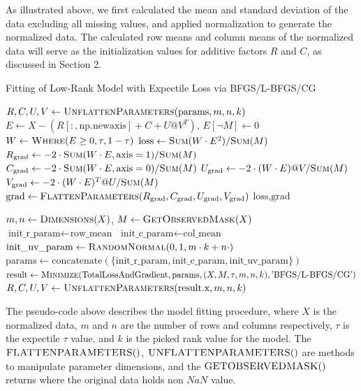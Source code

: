 \documentclass{article}
\begin{document}
As illustrated above, we first calculated the mean and standard deviation of the data excluding all missing values, and applied normalization to generate the normalized data. The calculated row means and column means of the normalized data will serve as the initialization values for additive factors $R$ and $C$, as discussed in Section 2. 


\begin{algorithm}[H]
\caption{Fitting of Low-Rank Model with Expectile Loss via BFGS/L-BFGS/CG}
\begin{algorithmic}[1]
    \State $R, C, U, V \gets \Call{UnflattenParameters}{\text{params}, m, n, k}$
    \State $E \gets X - (R[:, \text{np.newaxis}] + C + U @ V^T)$, $E[\neg M] \gets 0$
    \State $W \gets \Call{Where}{E \geq 0, \tau, 1 - \tau}$
    \State $\text{loss} \gets \Call{Sum}{W \cdot E^2} / \Call{Sum}{M}$
    \State $R_{\text{grad}} \gets -2 \cdot \Call{Sum}{W \cdot E, \text{axis}=1} / \Call{Sum}{M}$
    \State $C_{\text{grad}} \gets -2 \cdot \Call{Sum}{W \cdot E, \text{axis}=0} / \Call{Sum}{M}$
    \State $U_{\text{grad}} \gets -2 \cdot (W \cdot E) @ V / \Call{Sum}{M}$
    \State $V_{\text{grad}} \gets -2 \cdot (W \cdot E)^T @ U / \Call{Sum}{M}$
    \State $\text{grad} \gets \Call{FlattenParameters}{R_{\text{grad}}, C_{\text{grad}}, U_{\text{grad}}, V_{\text{grad}}}$
    \State \Return $\text{loss}, \text{grad}$
\EndFunction


    \State $m, n \gets \Call{Dimensions}{X}$, $M \gets \Call{GetObservedMask}{X}$
    \State $\text{init\_r\_param} \gets \text{row\_mean}$
    \State $\text{init\_c\_param} \gets \text{col\_mean}$
    \State $\text{init\_uv\_param} \gets \Call{RandomNormal}{0, 1, m \cdot k + n \cdot}$
    \State $\text{params} \gets \text{concatenate}(\{\text{init\_r\_param}, \text{init\_c\_param}, \text{init\_uv\_param}\})$
    \State $\text{result} \gets \Call{Minimize}{\text{TotalLossAndGradient}, \text{params}, (X, M, \tau, m, n, k), \text{'BFGS/L-BFGS/CG'}}$
    \State \Return $R, C, U, V \gets \Call{UnflattenParameters}{\text{result.x}, m, n, k}$
\EndFunction
\end{algorithmic}
\end{algorithm}
The pseudo-code above describes the model fitting procedure, where $X$ is the normalized data, $m$ and $n$ are the number of rows and columns respectively, $\tau$ is the expectile $\tau$ value, and $k$ is the picked rank value for the model. The $\Call{FLATTENPARAMETERS}$, $\Call{UNFLATTENPARAMETERS}$ are methods to manipulate parameter dimensions, and the $\Call{GETOBSERVEDMASK}$ returns where the original data holds non $NaN$ value.
\end{document}
